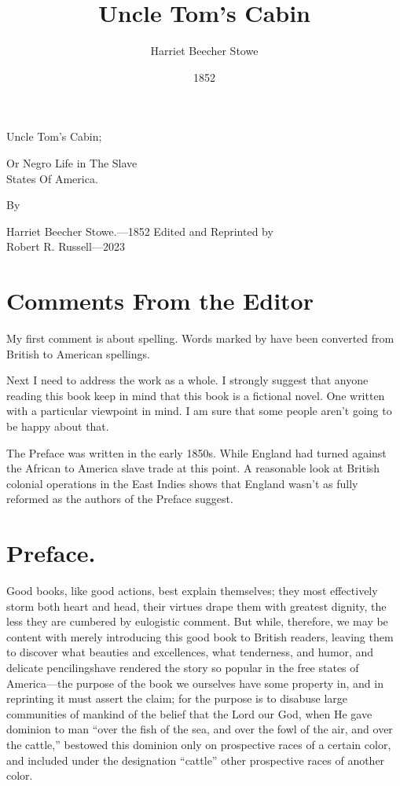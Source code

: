 \title{Uncle Tom's Cabin}
\author{Harriet Beecher Stowe}
\date{1852}
\begin{titlepage}
    \begin{center}
        \vspace*{1in}
        {\Huge Uncle Tom's Cabin;\par}
        {\large Or Negro Life in The Slave\\States Of America.\par}
        {\large By\par}
        {\huge Harriet Beecher Stowe.---1852}
        \vfill
        {\large Edited and Reprinted by\\Robert R. Russell---2023}
    \end{center}
\end{titlepage}

\cleardoublepage{}

\tableofcontents

\chapter{Comments From the Editor}

My first comment is about spelling. Words marked by \msc have been converted
from British to American spellings. 

Next I need to address the work as a whole. I strongly suggest that anyone
reading this book keep in mind that this book is a fictional novel. One written
with a particular viewpoint in mind. I am sure that some people aren't going to
be happy about that.

The Preface was written in the early 1850s. While England had turned against the
African to America slave trade at this point. A reasonable look at British
colonial operations in the East Indies shows that England wasn't as fully
reformed as the authors of the Preface suggest.

\chapter{Preface.}

Good books, like good actions, best explain themselves; they most effectively
storm both heart and head, their virtues drape them with greatest dignity, the
less they are cumbered by eulogistic comment. But while, therefore, we may be
content with merely introducing this good book to British readers, leaving them
to discover what beauties and excellences, what tenderness, and humor\msc, and
delicate pencilings\msc have rendered the story so popular in the free states of
America---the purpose of the book we ourselves have some property in, and in
reprinting it must assert the claim; for the purpose is to disabuse large
communities of mankind of the belief that the Lord our God, when He gave
dominion to man ``over the fish of the sea, and over the fowl of the air, and
over the cattle,'' bestowed this dominion only on prospective races of a certain
color\msc, and included under the designation ``cattle'' other prospective races
of another color\msc.

